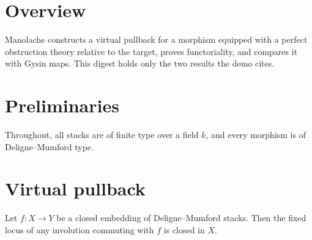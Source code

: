 
\section*{Overview}
Manolache constructs a virtual pullback for a morphism equipped with a perfect obstruction theory relative to the target, proves functoriality, and compares it with Gysin maps. This digest holds only the two results the demo cites.

\section{Preliminaries}\label{Man12-sec-2}

\begin{theorem}\label{Man12-setup}
Throughout, all stacks are of finite type over a field $k$, and every morphism is of Deligne--Mumford type.
\end{theorem}

\section{Virtual pullback}\label{Man12-sec-3}

\begin{proposition}\label{Man12-prop-3.2}
Let $f\colon X\to Y$ be a closed embedding of Deligne--Mumford stacks. Then the fixed locus of any involution commuting with $f$ is closed in $X$.
\end{proposition}
